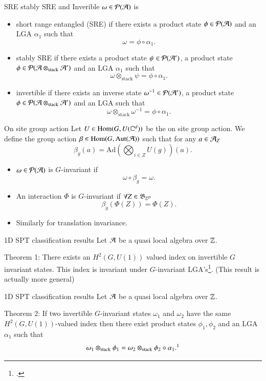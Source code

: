 \documentclass{beamer}
\begin{document}
\begin{frame}{SRE stably SRE and Inverible}
$\omega\in\mathcal{P}(\AA)$ is
\pause
\begin{itemize}
\item short range entangled (SRE) if there exists a product state $\phi\in\mathcal{P}(\AA)$ and an LGA $\alpha_1$ such that
\[\omega=\phi\circ\alpha_1.\]
\pause
\item stably SRE if there exists a product state $\psi\in\mathcal{P}(\AA')$, a product state $\phi\in\mathcal{P}(\AA\otimes_{\text{stack}} \AA')$ and an LGA $\alpha_1$ such that
\[\omega\otimes_{\text{stack}}\psi =\phi\circ\alpha_1.\]
\pause
\item invertible if there exists an inverse state $\omega^{-1}\in\mathcal{P}(\AA')$, a product state $\phi\in\mathcal{P}(\AA\otimes_{\text{stack}}\AA')$ and an LGA such that
\[\omega\otimes_{\text{stack}}\omega^{-1}=\phi\circ\alpha_1.\]
\end{itemize}
\end{frame}

\begin{frame}{On site group action}
Let $U\in\textrm{Hom}(G,U(\CC^d))$ be the on site group action. We define the group action $\beta\in\textrm{Hom}(G,\textrm{Aut}(\AA))$ such that for any $a\in\AA_Z$
\[\beta_g(a)=\textrm{Ad}\left(\bigotimes_{i\in Z}U(g)\right)(a).\]
\pause
\begin{itemize}
\item $\omega\in\mathcal{P}(\AA)$ is $G$-invariant if
\[\omega\circ\beta_g=\omega.\]
\pause
\item An interaction $\Phi$ is $G$-invariant if $\forall Z\in\mathfrak{B}_{\ZZ^D}$
\[\beta_g(\Phi(Z))=\Phi(Z).\]
\pause
\item Similarly for translation invariance.
\end{itemize}
\end{frame}

\begin{frame}{1D SPT classification results}
Let $\AA$ be a quasi local algebra over $\ZZ$.
\begin{block}{Theorem 1:}
There exists an $H^2(G,U(1))$ valued index on invertible $G$ invariant states. This index is invariant under $G$-invariant LGA's\footcite{ogata2019classification}. (This result is actually more general)
\end{block}
\end{frame}

\begin{frame}{1D SPT classification results}
Let $\AA$ be a quasi local algebra over $\ZZ$.
\begin{block}{Theorem 2:}
If two invertible $G$-invariant states $\omega_1$ and $\omega_2$ have the same $H^2(G,U(1))$-valued index then there exist product states $\phi_1,\phi_2$ and an LGA $\alpha_1$ such that
\[\omega_1\otimes_{\text{stack}}\phi_1=\omega_2\otimes_{\text{stack}}\phi_2\circ\alpha_1.\footcite{kapustin2021classification}\]
\end{block}
\end{frame}
\end{document}
